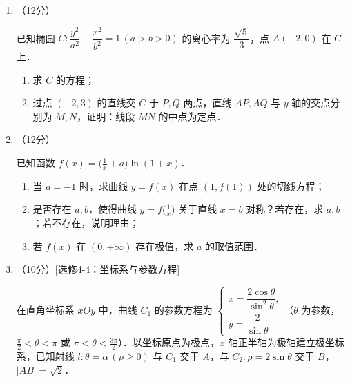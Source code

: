 \begin{description}
\begin{enumerate}[leftmargin=5pt]
        \begin{enumerate}[label=(\arabic*)]
            \item 证明：$EF\parallel$ 平面 $ADO$；
            \item 证明：平面 $ADO\perp$ 平面 $BEF$；
            \item 求二面角 $D$-$AO$-$C$ 的正弦值．
        \end{enumerate}

        \item （12分）

        已知椭圆 $C:\dfrac{y^2}{a^2}+\dfrac{x^2}{b^2}=1\,(a>b>0)$ 的离心率为 $\dfrac{\sqrt{5}}{3}$，点 $A(-2,0)$ 在 $C$ 上．

        \begin{enumerate}[label=(\arabic*)]
            \item 求 $C$ 的方程；
            \item 过点 $(-2,3)$ 的直线交 $C$ 于 $P,Q$ 两点，直线 $AP,AQ$ 与 $y$ 轴的交点分别为 $M,N$，证明：线段 $MN$ 的中点为定点．
        \end{enumerate}

        \item （12分）

        已知函数 $f(x)=\bigl(\frac{1}{x}+a\bigr)\ln(1+x)$．

        \begin{enumerate}[label=(\arabic*)]
            \item 当 $a=-1$ 时，求曲线 $y=f(x)$ 在点 $(1,f(1))$ 处的切线方程；
            \item 是否存在 $a,b$，使得曲线 $y=f\bigl(\frac{1}{x}\bigr)$ 关于直线 $x=b$ 对称？若存在，求 $a,b$；若不存在，说明理由；
            \item 若 $f(x)$ 在 $(0,+\infty)$ 存在极值，求 $a$ 的取值范围．
        \end{enumerate}

        \item （10分）[选修4-4：坐标系与参数方程]

        在直角坐标系 $xOy$ 中，曲线 $C_1$ 的参数方程为 $\begin{cases}x=\dfrac{2\cos\theta}{\sin^2\theta},\\y=\dfrac{2}{\sin\theta}\end{cases}$（$\theta$ 为参数，$\frac{\pi}{2}<\theta<\pi$ 或 $\pi<\theta<\frac{3\pi}{2}$）．以坐标原点为极点，$x$ 轴正半轴为极轴建立极坐标系，已知射线 $l:\theta=\alpha\,(\rho\geqslant0)$ 与 $C_1$ 交于 $A$，与 $C_2:\rho=2\sin\theta$ 交于 $B$，$|AB|=\sqrt{2}$．


\end{enumerate}
\end{description}
